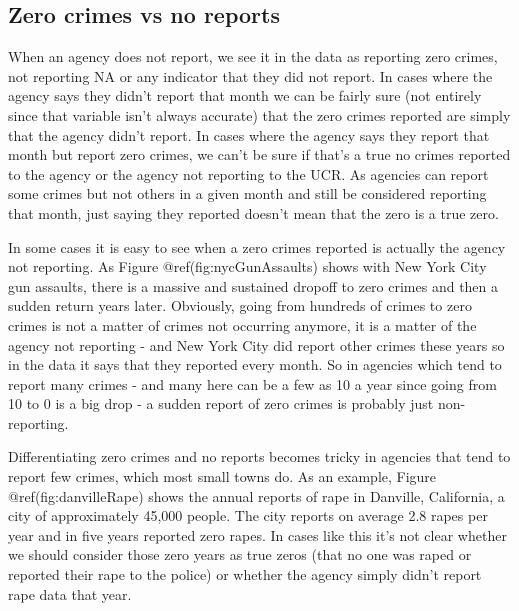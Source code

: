 \documentclass[
  12pt,
  openany]{book}
\begin{document}
\hypertarget{zero-crimes-vs-no-reports}{%
\subsection{Zero crimes vs no reports}\label{zero-crimes-vs-no-reports}}

When an agency does not report, we see it in the data as reporting zero crimes, not reporting NA or any indicator that they did not report. In cases where the agency says they didn't report that month we can be fairly sure (not entirely since that variable isn't always accurate) that the zero crimes reported are simply that the agency didn't report. In cases where the agency says they report that month but report zero crimes, we can't be sure if that's a true no crimes reported to the agency or the agency not reporting to the UCR. As agencies can report some crimes but not others in a given month and still be considered reporting that month, just saying they reported doesn't mean that the zero is a true zero.

In some cases it is easy to see when a zero crimes reported is actually the agency not reporting. As Figure @ref(fig:nycGunAssaults) shows with New York City gun assaults, there is a massive and sustained dropoff to zero crimes and then a sudden return years later. Obviously, going from hundreds of crimes to zero crimes is not a matter of crimes not occurring anymore, it is a matter of the agency not reporting - and New York City did report other crimes these years so in the data it says that they reported every month. So in agencies which tend to report many crimes - and many here can be a few as 10 a year since going from 10 to 0 is a big drop - a sudden report of zero crimes is probably just non-reporting.

Differentiating zero crimes and no reports becomes tricky in agencies that tend to report few crimes, which most small towns do. As an example, Figure @ref(fig:danvilleRape) shows the annual reports of rape in Danville, California, a city of approximately 45,000 people. The city reports on average 2.8 rapes per year and in five years reported zero rapes. In cases like this it's not clear whether we should consider those zero years as true zeros (that no one was raped or reported their rape to the police) or whether the agency simply didn't report rape data that year.
\end{document}
